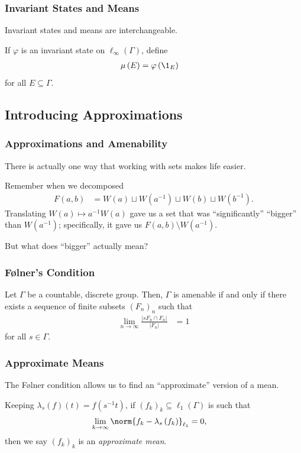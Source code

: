 \documentclass{beamer-custom}
\begin{document}
\begin{frame}
  \frametitle{Invariant States and Means}
  Invariant states and means are interchangeable.\pause\newline

  If $\varphi$ is an invariant state on $\ell_{\infty}\left( \Gamma \right)$, define
  \begin{align*}
    \mu\left( E \right) &= \varphi\left( \1_{E} \right)
  \end{align*}
  for all $E\subseteq \Gamma$.
\end{frame}
\subsection{Introducing Approximations}%
\begin{frame}
  \frametitle{Approximations and Amenability}
  There is actually one way that working with sets makes life easier.\pause\newline

  Remember when we decomposed
  \begin{align*}
    F(a,b) &= W(a) \sqcup W\left( a^{-1} \right) \sqcup W\left( b \right) \sqcup W\left( b^{-1} \right).
  \end{align*}
  Translating $W\left( a \right) \mapsto a^{-1}W\left( a \right)$ gave us a set that was ``significantly'' ``bigger'' than $W\left( a^{-1} \right)$; specifically, it gave us $F\left( a,b \right) \setminus W\left( a^{-1} \right)$.\pause\newline

  But what does ``bigger'' actually mean?
\end{frame}
\begin{frame}
  \frametitle{Følner's Condition}
  \begin{theorem}
    Let $\Gamma$ be a countable, discrete group. Then, $\Gamma$ is amenable if and only if there exists a sequence of finite subsets $\left( F_n \right)_n$ such that
    \begin{align*}
      \lim_{n\rightarrow\infty} \frac{\left\vert sF_n \cap F_n \right\vert}{\left\vert F_n \right\vert} &= 1
    \end{align*}
    for all $s\in\Gamma$.
  \end{theorem}
\end{frame}
\begin{frame}
  \frametitle{Approximate Means}
  The Følner condition allows us to find an ``approximate'' version of a mean.\pause\newline

  Keeping $\lambda_s(f)(t) = f\left( s^{-1}t \right)$, if $\left( f_k \right)_k\subseteq \ell_1\left( \Gamma \right)$ is such that
  \begin{align*}
    \lim_{k\rightarrow\infty}\norm{f_k - \lambda_s\left( f_k \right)}_{\ell_1} &= 0,
  \end{align*}
  then we say $\left( f_k \right)_k$ is an \textit{approximate mean}.
  \end{frame}
\end{document}
